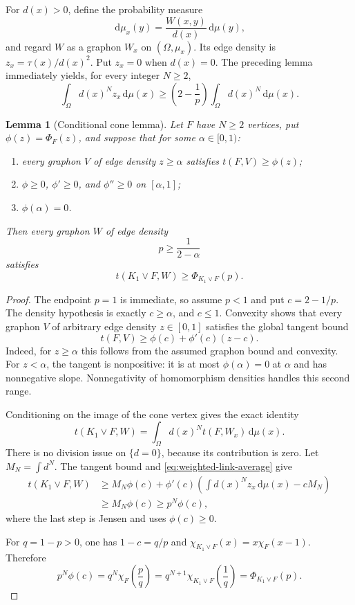 \documentclass[11pt]{article}
\newtheorem{lemma}[theorem]{Lemma}
\newcommand{\dd}{\,\mathrm{d}}
\newcommand{\join}{\mathbin{\vee}}
\begin{document}
For $d(x)>0$, define the probability measure
\[
 \dd\mu_x(y)=\frac{W(x,y)}{d(x)}\dd\mu(y),
\]
and regard $W$ as a graphon $W_x$ on $(\Omega,\mu_x)$.  Its edge density
is $z_x=\tau(x)/d(x)^2$.  Put $z_x=0$ when $d(x)=0$.  The preceding
lemma immediately yields, for every integer $N\geq2$,
\begin{equation}
 \int_\Omega d(x)^N z_x\dd\mu(x)
 \geq\left(2-\frac1p\right)\int_\Omega d(x)^N\dd\mu(x).
 \label{eq:weighted-link-average}
\end{equation}

\begin{lemma}[Conditional cone lemma]
\label{lem:conditional-cone}
Let $F$ have $N\geq2$ vertices, put $\phi(z)=\Phi_F(z)$, and suppose
that for some $\alpha\in[0,1)$:
\begin{enumerate}
\item every graphon $V$ of edge density $z\geq\alpha$ satisfies
$t(F,V)\geq\phi(z)$;
\item $\phi\geq0$, $\phi'\geq0$, and $\phi''\geq0$ on $[\alpha,1]$;
\item $\phi(\alpha)=0$.
\end{enumerate}
Then every graphon $W$ of edge density
\[
 p\geq\frac1{2-\alpha}
\]
satisfies
\[
 t(K_1\join F,W)\geq\Phi_{K_1\join F}(p).
\]
\end{lemma}

\begin{proof}
The endpoint $p=1$ is immediate, so assume $p<1$ and put
$c=2-1/p$.  The density hypothesis is exactly $c\geq\alpha$, and
$c\leq1$.  Convexity shows that every graphon $V$ of arbitrary edge
density $z\in[0,1]$ satisfies the global tangent bound
\[
 t(F,V)\geq\phi(c)+\phi'(c)(z-c).
\]
Indeed, for $z\geq\alpha$ this follows from the assumed graphon bound and
convexity.  For $z<\alpha$, the tangent is nonpositive: it is at most
$\phi(\alpha)=0$ at $\alpha$ and has nonnegative slope.  Nonnegativity of
homomorphism densities handles this second range.

Conditioning on the image of the cone vertex gives the exact identity
\[
 t(K_1\join F,W)=\int_\Omega d(x)^N t(F,W_x)\dd\mu(x).
\]
There is no division issue on $\{d=0\}$, because its contribution is zero.
Let $M_N=\int d^N$.  The tangent bound and
\eqref{eq:weighted-link-average} give
\begin{align*}
 t(K_1\join F,W)
 &\geq M_N\phi(c)
 +\phi'(c)\left(\int d(x)^Nz_x\dd\mu(x)-cM_N\right)
 \\
 &\geq M_N\phi(c)
 \geq p^N\phi(c),
\end{align*}
where the last step is Jensen and uses $\phi(c)\geq0$.

For $q=1-p>0$, one has $1-c=q/p$ and
$\chi_{K_1\join F}(x)=x\chi_F(x-1)$.  Therefore
\[
 p^N\phi(c)
 =q^N\chi_F\left(\frac pq\right)
 =q^{N+1}\chi_{K_1\join F}\left(\frac1q\right)
 =\Phi_{K_1\join F}(p).
\]
\end{proof}
\end{document}
